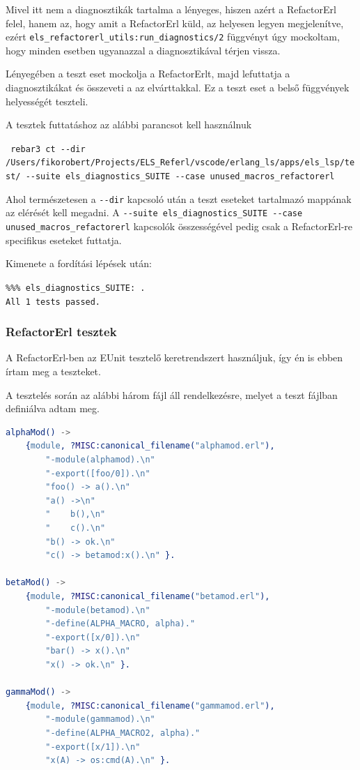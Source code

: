 Mivel itt nem a diagnosztikák tartalma a lényeges, hiszen azért a RefactorErl felel, hanem az, hogy amit a RefactorErl küld, az helyesen legyen megjelenítve, ezért \lstinline{els_refactorerl_utils:run_diagnostics/2} függvényt úgy mockoltam, hogy minden esetben ugyanazzal a diagnosztikával térjen vissza.

Lényegében a teszt eset mockolja a RefactorErlt, majd lefuttatja a diagnosztikákat és összeveti a az elvárttakkal. Ez a teszt eset a belső függvények helyességét teszteli.

\noindent A tesztek futtatáshoz az alábbi parancsot kell használnuk

\noindent \lstinline{ rebar3 ct --dir /Users/fikorobert/Projects/ELS_Referl/vscode/erlang_ls/apps/els_lsp/test/ --suite els_diagnostics_SUITE --case unused_macros_refactorerl}

\noindent Ahol természetesen a \lstinline{--dir} kapcsoló után a teszt eseteket tartalmazó mappának az elérését kell megadni. A \lstinline{--suite els_diagnostics_SUITE --case unused_macros_refactorerl} kapcsolók összességével pedig csak a RefactorErl-re specifikus eseteket futtatja.

\noindent Kimenete a fordítási lépések után:

\noindent \lstinline{%%% els_diagnostics_SUITE: .} \\
\lstinline{All 1 tests passed.}

\subsubsection{RefactorErl tesztek}

A RefactorErl-ben az EUnit \cite{testEunit} tesztelő keretrendszert használjuk, így én is ebben írtam meg a teszteket. 

A tesztelés során az alábbi három fájl áll rendelkezésre, melyet a teszt fájlban definiálva adtam meg.

\newpage

\begin{lstlisting}[language={erlang}]
alphaMod() -> 
    {module, ?MISC:canonical_filename("alphamod.erl"),
        "-module(alphamod).\n"
        "-export([foo/0]).\n"
        "foo() -> a().\n"
        "a() ->\n"
        "    b(),\n"
        "    c().\n"
        "b() -> ok.\n"
        "c() -> betamod:x().\n" }.

betaMod() -> 
    {module, ?MISC:canonical_filename("betamod.erl"),
        "-module(betamod).\n"
        "-define(ALPHA_MACRO, alpha)."
        "-export([x/0]).\n"
        "bar() -> x().\n"
        "x() -> ok.\n" }.

gammaMod() -> 
    {module, ?MISC:canonical_filename("gammamod.erl"),
        "-module(gammamod).\n"
        "-define(ALPHA_MACRO2, alpha)."
        "-export([x/1]).\n"
        "x(A) -> os:cmd(A).\n" }.
\end{lstlisting}


